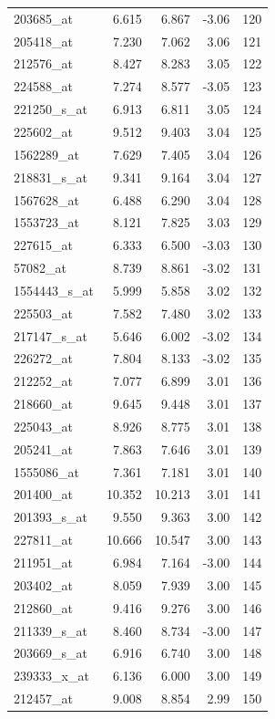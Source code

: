 \begin{footnotesize}
\begin{longtable}{lrrrr}
203685\_at & 6.615 & 6.867 & -3.06 & 120 \\
205418\_at & 7.230 & 7.062 & 3.06 & 121 \\
212576\_at & 8.427 & 8.283 & 3.05 & 122 \\
224588\_at & 7.274 & 8.577 & -3.05 & 123 \\
221250\_s\_at & 6.913 & 6.811 & 3.05 & 124 \\
225602\_at & 9.512 & 9.403 & 3.04 & 125 \\
1562289\_at & 7.629 & 7.405 & 3.04 & 126 \\
218831\_s\_at & 9.341 & 9.164 & 3.04 & 127 \\
1567628\_at & 6.488 & 6.290 & 3.04 & 128 \\
1553723\_at & 8.121 & 7.825 & 3.03 & 129 \\
227615\_at & 6.333 & 6.500 & -3.03 & 130 \\
57082\_at & 8.739 & 8.861 & -3.02 & 131 \\
1554443\_s\_at & 5.999 & 5.858 & 3.02 & 132 \\
225503\_at & 7.582 & 7.480 & 3.02 & 133 \\
217147\_s\_at & 5.646 & 6.002 & -3.02 & 134 \\
226272\_at & 7.804 & 8.133 & -3.02 & 135 \\
212252\_at & 7.077 & 6.899 & 3.01 & 136 \\
218660\_at & 9.645 & 9.448 & 3.01 & 137 \\
225043\_at & 8.926 & 8.775 & 3.01 & 138 \\
205241\_at & 7.863 & 7.646 & 3.01 & 139 \\
1555086\_at & 7.361 & 7.181 & 3.01 & 140 \\
201400\_at & 10.352 & 10.213 & 3.01 & 141 \\
201393\_s\_at & 9.550 & 9.363 & 3.00 & 142 \\
227811\_at & 10.666 & 10.547 & 3.00 & 143 \\
211951\_at & 6.984 & 7.164 & -3.00 & 144 \\
203402\_at & 8.059 & 7.939 & 3.00 & 145 \\
212860\_at & 9.416 & 9.276 & 3.00 & 146 \\
211339\_s\_at & 8.460 & 8.734 & -3.00 & 147 \\
203669\_s\_at & 6.916 & 6.740 & 3.00 & 148 \\
239333\_x\_at & 6.136 & 6.000 & 3.00 & 149 \\
212457\_at & 9.008 & 8.854 & 2.99 & 150 \\

\end{longtable}
\end{footnotesize}
